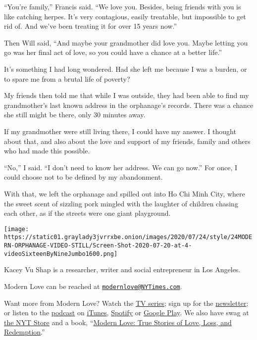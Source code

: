 ``You're family,'' Francis said. ``We love you. Besides, being friends
with you is like catching herpes. It's very contagious, easily
treatable, but impossible to get rid of. And we've been treating it for
over 15 years now.''

Then Will said, ``And maybe your grandmother did love you. Maybe letting
you go was her final act of love, so you could have a chance at a better
life.''

It's something I had long wondered. Had she left me because I was a
burden, or to spare me from a brutal life of poverty?

My friends then told me that while I was outside, they had been able to
find my grandmother's last known address in the orphanage's records.
There was a chance she still might be there, only 30 minutes away.

If my grandmother were still living there, I could have my answer. I
thought about that, and also about the love and support of my friends,
family and others who had made this possible.

``No,'' I said. ``I don't need to know her address. We can go now.'' For
once, I could choose not to be defined by my abandonment.

With that, we left the orphanage and spilled out into Ho Chi Minh City,
where the sweet scent of sizzling pork mingled with the laughter of
children chasing each other, as if the streets were one giant
playground.

\texttt{[image: https://static01.graylady3jvrrxbe.onion/images/2020/07/24/style/24MODERN-ORPHANAGE-VIDEO-STILL/Screen-Shot-2020-07-20-at-4-videoSixteenByNineJumbo1600.png]}

Kacey Vu Shap is a researcher, writer and social entrepreneur in Los
Angeles.

Modern Love can be reached at
\href{mailto:modernlove@NYTimes.com}{\nolinkurl{modernlove@NYTimes.com}}.

Want more from Modern Love? Watch the
\href{https://www.nytimes3xbfgragh.onion/2019/09/12/style/modern-love-tv-show-trailer.html}{TV
series}; sign up for the
\href{https://www.nytimes3xbfgragh.onion/newsletters/love-letter}{newsletter};
or listen to the
\href{https://www.nytimes3xbfgragh.onion/column/modern-love-podcast}{podcast}
on
\href{https://itunes.apple.com/us/podcast/modern-love/id1065559535?mt=2\&version=meter+at+0\&module=meter-Links\&pgtype=article\&contentId=\&mediaId=\&referrer=\&priority=true\&action=click\&contentCollection=meter-links-click}{iTunes},
\href{https://open.spotify.com/show/03Er7mSPq9IEewOgbPD3vO}{Spotify} or
\href{https://play.google.com/music/listen?u=0\#/ps/Iktqjbkz7bychbnofblw32dik64}{Google
Play}. We also have swag at
\href{https://store.nytimes3xbfgragh.onion/collections/modern-love}{the
NYT Store} and a book,
``\href{https://www.penguinrandomhouse.com/books/623036/modern-love-revised-and-updated-by-edited-by-daniel-jones-with-contributions-by-andrew-rannells-ayelet-waldman-amy-krouse-rosenthal-veronica-chambers-and-more/}{Modern
Love: True Stories of Love, Loss, and Redemption}.''

